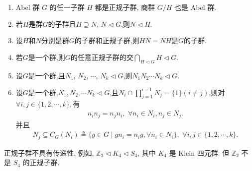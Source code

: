 \documentclass[../../main.tex]{subfiles}%
\begin{document}
\begin{proposition}\label{proposition:正规子群的基本性质}
\begin{enumerate}[(1)]
\item\label{proposition:正规子群的基本性质-1} Abel 群 \( G \) 的任一子群 \( H \) 都是正规子群, 商群 \( G/H \) 也是 Abel 群.

\item\label{proposition:正规子群的基本性质-2} 若$H$是群$G$的子群且$H\supseteq N,\,N\lhd G$,则$N\lhd H.$

\item\label{proposition:正规子群的基本性质-6} 设$H$和$N$分别是群$G$的子群和正规子群,则$HN=NH$是$G$的子群.

\item\label{proposition:正规子群的基本性质-5} 若$G$是一个群,则$G$的任意正规子群的交$\bigcap_{H\lhd G}{H}\lhd G$.

\item\label{proposition:正规子群的基本性质-3} 设$G$是一个群,且$N_1$, $N_2$, $\cdots$, $N_k\lhd G$,则$N_1 N_2\cdots N_k\lhd G.$

\item\label{proposition:正规子群的基本性质-7} 设$G$是一个群,$N_1,N_2,\cdots N_k\lhd G$,且$N_i\cap \prod_{j=1}^{i-1}{N_j}=\{1\}(i\neq j)$,则对$\forall i,j\in \{1,2,\cdots,k\},$有
\begin{align*}
n_in_j=n_jn_i,\,\,\forall n_i\in N_i,n_j\in N_j.
\end{align*}
并且
\begin{align*}
N_j\subseteq C_G(N_i) \triangleq  \{g\in G\mid gn_i = n_ig ,\forall n_i\in N_i\},\,\,\forall i,j\in \{1,2,\cdots,k\}.
\end{align*}
\end{enumerate}
\end{proposition}
\begin{remark}
正规子群不具有传递性. 例如, $\mathbb{Z}_2 \lhd K_4 \lhd S_4$, 其中 $K_4$ 是 Klein 四元群. 但 $\mathbb{Z}_2$ 不是 $S_4$ 的正规子群.
\end{remark}
\end{document}
